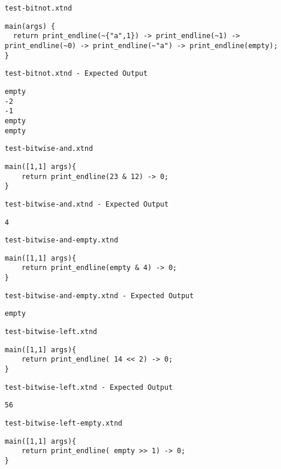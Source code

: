 \medskip \noindent \texttt{test-bitnot.xtnd}


\begin{lstlisting}
main(args) {
  return print_endline(~{"a",1}) -> print_endline(~1) -> print_endline(~0) -> print_endline(~"a") -> print_endline(empty);
}
\end{lstlisting}


\medskip \noindent \texttt{test-bitnot.xtnd - Expected Output}


\begin{lstlisting}
empty
-2
-1
empty
empty
\end{lstlisting}


\medskip \noindent \texttt{test-bitwise-and.xtnd}


\begin{lstlisting}
main([1,1] args){
	return print_endline(23 & 12) -> 0;
}
\end{lstlisting}


\medskip \noindent \texttt{test-bitwise-and.xtnd - Expected Output}


\begin{lstlisting}
4
\end{lstlisting}


\medskip \noindent \texttt{test-bitwise-and-empty.xtnd}


\begin{lstlisting}
main([1,1] args){
	return print_endline(empty & 4) -> 0;
}
\end{lstlisting}


\medskip \noindent \texttt{test-bitwise-and-empty.xtnd - Expected Output}


\begin{lstlisting}
empty
\end{lstlisting}


\medskip \noindent \texttt{test-bitwise-left.xtnd}


\begin{lstlisting}
main([1,1] args){
	return print_endline( 14 << 2) -> 0;
}
\end{lstlisting}


\medskip \noindent \texttt{test-bitwise-left.xtnd - Expected Output}


\begin{lstlisting}
56
\end{lstlisting}


\medskip \noindent \texttt{test-bitwise-left-empty.xtnd}


\begin{lstlisting}
main([1,1] args){
	return print_endline( empty >> 1) -> 0;
}
\end{lstlisting}


